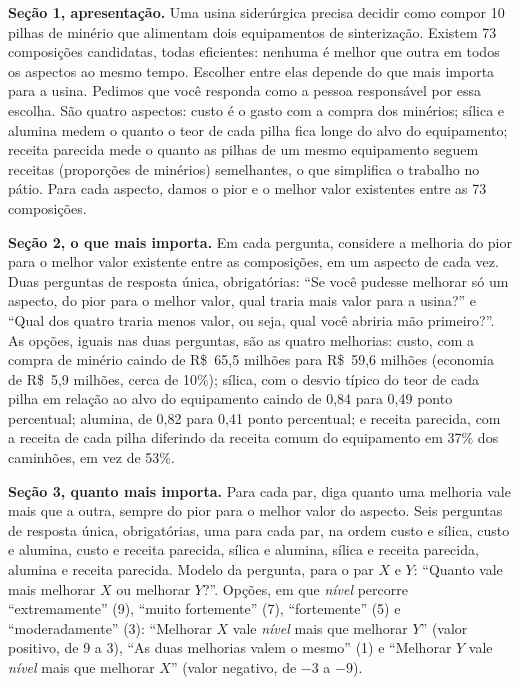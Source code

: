 \documentclass[conference]{IEEEtran}
\begin{document}
\begingroup\footnotesize

\textbf{Seção 1, apresentação.} Uma usina siderúrgica precisa decidir como compor 10 pilhas de minério que alimentam dois equipamentos de sinterização. Existem 73 composições candidatas, todas eficientes: nenhuma é melhor que outra em todos os aspectos ao mesmo tempo. Escolher entre elas depende do que mais importa para a usina. Pedimos que você responda como a pessoa responsável por essa escolha. São quatro aspectos: custo é o gasto com a compra dos minérios; sílica e alumina medem o quanto o teor de cada pilha fica longe do alvo do equipamento; receita parecida mede o quanto as pilhas de um mesmo equipamento seguem receitas (proporções de minérios) semelhantes, o que simplifica o trabalho no pátio. Para cada aspecto, damos o pior e o melhor valor existentes entre as 73 composições.

\textbf{Seção 2, o que mais importa.} Em cada pergunta, considere a melhoria do pior para o melhor valor existente entre as composições, em um aspecto de cada vez. Duas perguntas de resposta única, obrigatórias: ``Se você pudesse melhorar só um aspecto, do pior para o melhor valor, qual traria mais valor para a usina?'' e ``Qual dos quatro traria menos valor, ou seja, qual você abriria mão primeiro?''. As opções, iguais nas duas perguntas, são as quatro melhorias: custo, com a compra de minério caindo de R\$~65,5 milhões para R\$~59,6 milhões (economia de R\$~5,9 milhões, cerca de 10\%); sílica, com o desvio típico do teor de cada pilha em relação ao alvo do equipamento caindo de 0,84 para 0,49 ponto percentual; alumina, de 0,82 para 0,41 ponto percentual; e receita parecida, com a receita de cada pilha diferindo da receita comum do equipamento em 37\% dos caminhões, em vez de 53\%.

\textbf{Seção 3, quanto mais importa.} Para cada par, diga quanto uma melhoria vale mais que a outra, sempre do pior para o melhor valor do aspecto. Seis perguntas de resposta única, obrigatórias, uma para cada par, na ordem custo e sílica, custo e alumina, custo e receita parecida, sílica e alumina, sílica e receita parecida, alumina e receita parecida. Modelo da pergunta, para o par $X$ e $Y$: ``Quanto vale mais melhorar $X$ ou melhorar $Y$?''. Opções, em que \textit{nível} percorre ``extremamente'' (9), ``muito fortemente'' (7), ``fortemente'' (5) e ``moderadamente'' (3): ``Melhorar $X$ vale \textit{nível} mais que melhorar $Y$'' (valor positivo, de 9 a 3), ``As duas melhorias valem o mesmo'' (1) e ``Melhorar $Y$ vale \textit{nível} mais que melhorar $X$'' (valor negativo, de $-3$ a $-9$).
\end{document}
